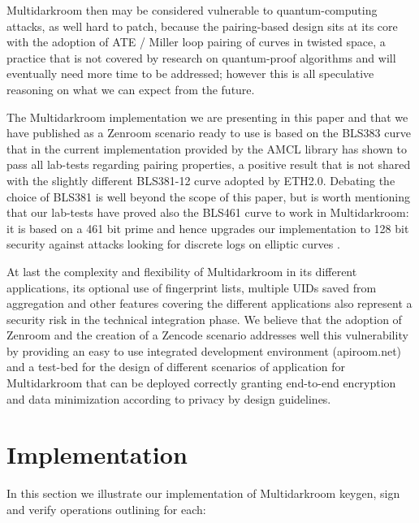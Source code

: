 \documentclass[twocolumn]{article}
\begin{document}
Multidarkroom then may be considered vulnerable to quantum-computing
attacks, as well hard to patch, because the pairing-based design sits at
its core with the adoption of ATE / Miller loop pairing of curves in
twisted space, a practice that is not covered by research on
quantum-proof algorithms and will eventually need more time to be
addressed; however this is all speculative reasoning on what we can
expect from the future.

The Multidarkroom implementation we are presenting in this paper and
that we have published as a Zenroom scenario ready to use is based on
the BLS383 curve \citep{bls383} that in the current implementation
provided by the AMCL library has shown to pass all lab-tests regarding
pairing properties, a positive result that is not shared with the
slightly different BLS381-12 curve adopted by ETH2.0. Debating the
choice of BLS381 is well beyond the scope of this paper, but is worth
mentioning that our lab-tests have proved also the BLS461 curve to work
in Multidarkroom: it is based on a 461 bit prime and hence upgrades our
implementation to 128 bit security \citep{updating-key-pairings} against
attacks looking for discrete logs on elliptic curves
\citep{discrete-log-attack}.


At last the complexity and flexibility of Multidarkroom in its different applications, its optional use of fingerprint lists, multiple UIDs saved from aggregation and other features covering the different applications also represent a security risk in the technical integration phase. We believe that the adoption of Zenroom and the creation of a Zencode scenario addresses well this vulnerability by providing an easy to use integrated development environment (apiroom.net) and a test-bed for the design of different scenarios of application for Multidarkroom that can be deployed correctly granting end-to-end encryption and data minimization according to privacy by design guidelines. %

\section{Implementation}
\label{sec:implementation}


In this section we illustrate our implementation of Multidarkroom
keygen, sign and verify operations outlining for each:
\end{document}

